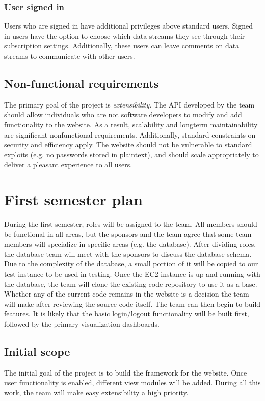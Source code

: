 \documentclass[12pt]{article}
\begin{document}
\begin{spacing}{1.5}
\subsubsection{User signed in}
Users who are signed in have additional privileges above standard users. Signed in users have the option to choose which data streams they see through their subscription settings. Additionally, these users can leave comments on data streams to communicate with other users.

\subsection{Non-functional requirements}
The primary goal of the project is \emph{extensibility}. The API developed by the team should allow individuals who are not software developers to modify and add functionality to the website. As a result, scalability and longterm maintainability are significant nonfunctional requirements. Additionally, standard constraints on security and efficiency apply. The website should not be vulnerable to standard exploits (e.g. no passwords stored in plaintext), and should scale appropriately to deliver a pleasant experience to all users.

\newpage

\section{First semester plan}
During the first semester, roles will be assigned to the team. All members should be functional in all areas, but the sponsors and the team agree that some team members will specialize in specific areas (e.g. the database). After dividing roles, the database team will meet with the sponsors to discuss the database schema. Due to the complexity of the database, a small portion of it will be copied to our test instance to be used in testing.
\newline \newline
Once the EC2 instance is up and running with the database, the team will clone the existing code repository to use it as a base. Whether any of the current code remains in the website is a decision the team will make after reviewing the source code itself. The team can then begin to build features. It is likely that the basic login/logout functionality will be built first, followed by the primary visualization dashboards.

\subsection{Initial scope}
The initial goal of the project is to build the framework for the website. Once user functionality is enabled, different view modules will be added. During all this work, the team will make easy extensibility a high priority.


\end{spacing}
\end{document}
